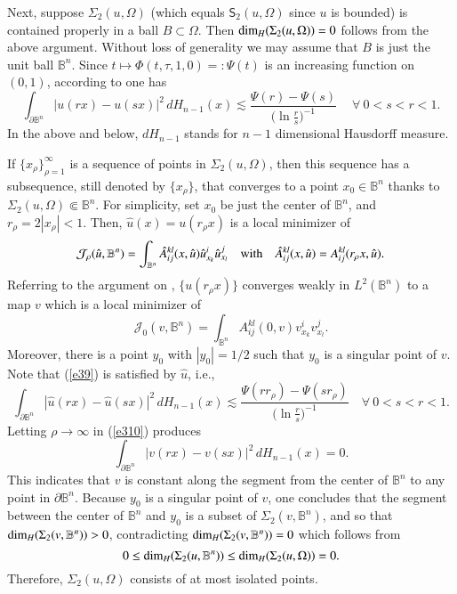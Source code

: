 \documentclass[12pt]{amsart}
\begin{document}
Next, suppose $\Sigma_2(u,\Omega)$ (which equals $\mathsf{S}_2(u,\Omega)$ since $u$ is bounded) is contained properly in a ball $B\subset\Omega$. Then $\hbox{dim}_H(\Sigma_2(u,\Omega))=0$ follows from the above argument. Without loss of generality we may assume that $B$ is just the unit ball $\mathbb B^n$. Since $t\mapsto\Phi(t,\tau,1,0)=:\Psi(t)$ is an increasing function on $(0,1)$, according to \cite[(15)]{GG1984} one has
\begin{equation}\label{e39}
\int_{\partial\mathbb B^n}|u(rx)-u(sx)|^2\,d{H}_{n-1}(x)\lesssim \frac{\Psi(r)-\Psi(s)}{\big(\ln\frac{r}{s}\big)^{-1}}\quad \ \forall\ 0<s<r<1.
\end{equation}
In the above and below, $dH_{n-1}$ stands for $n-1$ dimensional Hausdorff measure.

If $\{x_\rho\}_{\rho=1}^\infty$ is a sequence of points in $\Sigma_2(u,\Omega)$, then this sequence has a subsequence, still denoted by $\{x_\rho\}$, that converges to a point $x_0\in\mathbb B^n$ thanks to $\Sigma_2(u,\Omega)\Subset\mathbb B^n$. For simplicity, set $x_0$ be just the center of $\mathbb B^n$, and $r_\rho=2|x_\rho|<1$. Then, $\hat{u}(x)=u(r_\rho x)$ is a local minimizer of
$$
\mathcal{J}_\rho(\hat{u},\mathbb B^n)=\int_{\mathbb B^n} \hat{A}^{kl}_{ij}(x,\hat{u}) \hat{u}^i_{x_k} \hat{u}^j_{x_l}\quad\hbox{with}\quad \hat{A}^{kl}_{ij}(x,\hat{u})=A^{kl}_{ij}(r_\rho x,\hat{u}).
$$
Referring to the argument on \cite[Page 52]{GG1984}, $\{u(r_\rho x)\}$ converges weakly in $L^2(\mathbb B^n)$ to a map $v$ which is a local minimizer of
$$
\mathcal{J}_0(v,\mathbb B^n)=\int_{\mathbb B^n} {A}^{kl}_{ij}(0,v) {v}^i_{x_k} {v}^j_{x_l}.
$$
Moreover, there is a point $y_0$ with $|y_0|=1/2$ such that $y_0$ is a singular point of $v$.
Note that (\ref{e39}) is satisfied by $\hat{u}$, i.e.,
\begin{equation}\label{e310}
\int_{\partial\mathbb B^n}|\hat{u}(rx)-\hat{u}(sx)|^2\,d{H}_{n-1}(x)\lesssim \frac{\Psi({rr_\rho})-\Psi({sr_\rho})}{\big(\ln \frac{r}{s}\big)^{-1}}\quad\forall\ 0<s<r<1.
\end{equation}
Letting $\rho\to\infty$ in (\ref{e310}) produces
$$
\int_{\partial\mathbb B^n}|v(rx)-v(sx)|^2\,d{H}_{n-1}(x)=0.
$$
This indicates that $v$ is constant along the segment from the center of $\mathbb B^n$ to any point in $\partial\mathbb B^n$. Because $y_0$ is a singular point of $v$, one concludes that the segment between the center of $\mathbb B^n$ and $y_0$ is a subset of $\Sigma_2(v,\mathbb B^n)$, and so that $\hbox{dim}_H(\Sigma_2(v,\mathbb B^n))>0$, contradicting  $\hbox{dim}_H(\Sigma_2(v,\mathbb B^n))=0$ which follows from
$$
0\le\hbox{dim}_H(\Sigma_2(u,\mathbb B^n))\le\hbox{dim}_H(\Sigma_2(u,\Omega))=0.
$$
Therefore, $\Sigma_2(u,\Omega)$ consists of at most isolated points.
\end{document}
